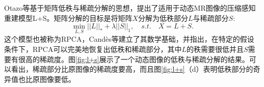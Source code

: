 Otazo等基于矩阵低秩与稀疏分解的思想，提出了适用于动态MR图像的压缩感知重建模型L+S\cite{lpluss}。矩阵分解的目标是将矩阵$X$分解为低秩部分$L$与稀疏部分$S$:
\begin{equation}
	\min_{L,S}||L||_*+\lambda||S||_1, \quad s.t. \quad X=L+S.
\end{equation}
这个模型也被称为RPCA，Candès等\cite{rpca}建立了其数学基础，并指出，在特定的假设条件下，RPCA可以完美地恢复出低秩和稀疏部分，其中$L$的秩需要很低并且$S$需要有很高的稀疏度。图\ref{fig:l+s}展示了一个动态图像的低秩与稀疏分解的结果。可以看出，稀疏部分比原图像的稀疏度要高，而且图\ref{fig:l+s}（d）表明低秩部分的奇异值也比原图像要低。
\begin{figure}[htbp]
\centering
{}


\end{figure}
